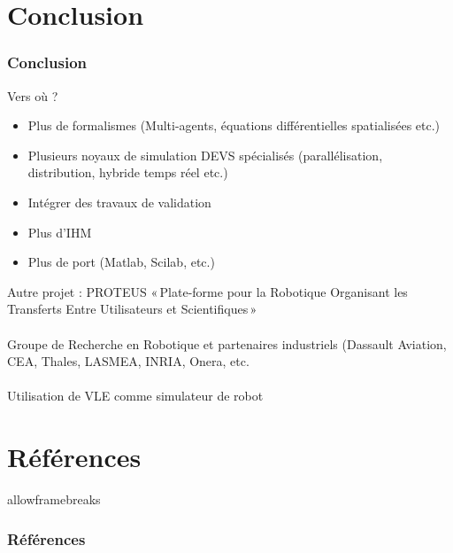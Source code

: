 \documentclass[xetex, compress, table, dvipsnames]{beamer}
\begin{document}
\section{Conclusion}

\begin{frame}
  \frametitle{Conclusion}
  \begin{block}{Vers où ?}
    \begin{itemize}
    \item Plus de formalismes (Multi-agents, équations différentielles
      spatialisées etc.)
    \item Plusieurs noyaux de simulation DEVS spécialisés
      (parallélisation, distribution, hybride temps réel etc.)
    \item Intégrer des travaux de validation
    \item Plus d'IHM
    \item Plus de port (Matlab, Scilab, etc.)
    \end{itemize}
  \end{block}
  \pause
  \begin{block}{Autre projet : PROTEUS}
    «\,Plate-forme pour la Robotique Organisant les Transferts Entre
    Utilisateurs et Scientifiques\,»
    \\~\\
    Groupe de Recherche en Robotique et partenaires industriels
    (Dassault Aviation, CEA, Thales, LASMEA, INRIA, Onera, etc.
    \\~\\
    Utilisation de VLE comme simulateur de robot
  \end{block}
\end{frame}

\section*{Références}

\begin{frame}{allowframebreaks}
  \frametitle{Références}
  \small{
    
    
}
\end{frame}
\end{document}

